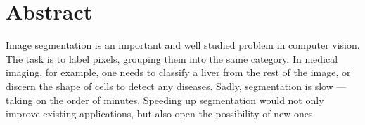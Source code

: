 \documentclass[
10pt, %
letterpaper, %
oneside, %
headinclude,footinclude, %
BCOR5mm, %
]{scrartcl}
\title{\normalfont\spacedallcaps{Evaluation Segmentation on GPUs}} %
\author{\spacedlowsmallcaps{Abdul Dakkak}} %
\date{} %
\begin{document}

\renewcommand{\sectionmark}[1]{\markright{\spacedlowsmallcaps{#1}}} %
\lehead{\mbox{\llap{\small\thepage\kern1em\color{halfgray} \vline}\color{halfgray}\hspace{0.5em}\rightmark\hfil}} %

\pagestyle{scrheadings} %


\maketitle %

\setcounter{tocdepth}{2} %



\section*{Abstract} %

Image segmentation is an important and well studied problem in computer vision.
The task is to label pixels, grouping them into the same category.
In medical imaging, for example, one needs to classify a liver from the rest of 
  the image, or discern the shape of cells to detect any diseases.
Sadly, segmentation is slow --- taking on the order of minutes.
Speeding up segmentation would not only improve existing applications, but 
  also open the possibility of new ones.
\end{document}
